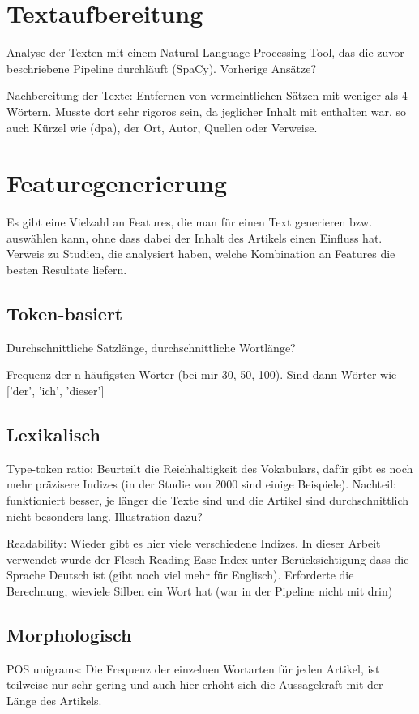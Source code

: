 \section{Textaufbereitung}
Analyse der Texten mit einem Natural Language Processing Tool, das die zuvor beschriebene Pipeline durchläuft (SpaCy). Vorherige Ansätze?

Nachbereitung der Texte: Entfernen von vermeintlichen Sätzen mit weniger als 4 Wörtern. Musste dort sehr rigoros sein, da jeglicher Inhalt mit enthalten war, so auch Kürzel wie (dpa), der Ort, Autor, Quellen oder Verweise.
\section{Featuregenerierung}
Es gibt eine Vielzahl an Features, die man für einen Text generieren bzw. auswählen kann, ohne dass dabei der Inhalt des Artikels einen Einfluss hat. Verweis zu Studien, die analysiert haben, welche Kombination an Features die besten Resultate liefern.
\subsection{Token-basiert}
Durchschnittliche Satzlänge, durchschnittliche Wortlänge?

Frequenz der n häufigsten Wörter (bei mir 30, 50, 100). Sind dann Wörter wie ['der', 'ich', 'dieser']
\subsection{Lexikalisch}
Type-token ratio: Beurteilt die Reichhaltigkeit des Vokabulars, dafür gibt es noch mehr präzisere Indizes (in der Studie von 2000 sind einige Beispiele). Nachteil: funktioniert besser, je länger die Texte sind und die Artikel sind durchschnittlich nicht besonders lang. Illustration dazu?

Readability: Wieder gibt es hier viele verschiedene Indizes. In dieser Arbeit verwendet wurde der Flesch-Reading Ease Index unter Berücksichtigung dass die Sprache Deutsch ist (gibt noch viel mehr für Englisch). Erforderte die Berechnung, wieviele Silben ein Wort hat (war in der Pipeline nicht mit drin)
\subsection{Morphologisch}
POS unigrams: Die Frequenz der einzelnen Wortarten für jeden Artikel, ist teilweise nur sehr gering und auch hier erhöht sich die Aussagekraft mit der Länge des Artikels.

